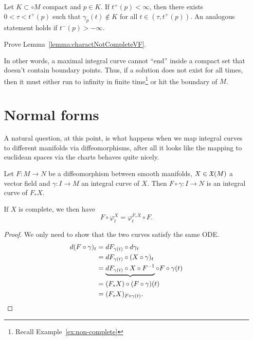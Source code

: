 \begin{lemma}\label{lemma:charactNotCompleteVF}
  Let $K\subset \circ M$ compact and $p\in K$.
  If $t^+(p) < \infty$, then there exists $0<\tau<t^+(p)$ such that $\gamma_p(t)\not\in K$ for all $t\in (\tau, t^+(p))$.
  An analogous statement holds if $t^-(p) > -\infty$.
\end{lemma}

\begin{exercise}
  Prove Lemma~\ref{lemma:charactNotCompleteVF}.
\end{exercise}

In other words, a maximal integral curve cannot ``end'' inside a compact set that doesn't contain boundary points.
Thus, if a solution does not exist for all times, then it must either run to infinity in finite time\footnote{Recall Example~\ref{ex:non-complete}} or hit the boundary of $M$.

\section{Normal forms}

A natural question, at this point, is what happens when we map integral curves to different manifolds via diffeomorphisms, after all it looks like the mapping to euclidean spaces via the charts behaves quite nicely.

\begin{proposition}\label{prop:conjpfX}
  Let $F: M \to N$ be a diffeomorphism between smooth manifolds, $X\in\mathfrak{X}(M)$ a vector field and $\gamma:I\to M$ an integral curve of $X$. Then $F\circ\gamma : I \to N$ is an integral curve of $F_* X$.

  If $X$ is complete, we then have
  \begin{equation}
    F\circ\varphi_t^X = \varphi_t^{F_* X}\circ F.
  \end{equation}
\end{proposition}
\begin{proof}
  We only need to show that the two curves satisfy the same ODE.
  \begin{align*}
    d(F\circ \gamma)_t 
    &= dF_{\gamma(t)} \circ d\gamma_t \\
    &= dF_{\gamma(t)} \circ (X \circ \gamma)_t \\
    &= \LaTeXunderbrace{dF_{\gamma(t)} \circ X \circ F^{-1}} \circ F \circ \gamma(t) \\
    &= (F_* X) \circ (F\circ \gamma)(t) \\
    &= (F_* X)_{F\circ\gamma(t)}.
  \end{align*}
\end{proof}

